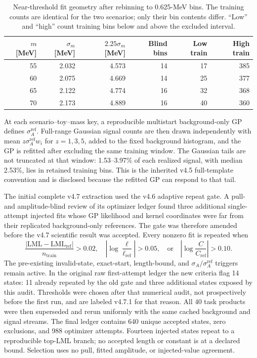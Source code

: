 \begin{table}[htbp]
\centering
\caption{Near-threshold fit geometry after rebinning to 0.625-MeV bins.  The
training counts are identical for the two scenarios; only their bin contents
differ.  ``Low'' and ``high'' count training bins below and above the excluded
interval.}
\label{tab:v4p7-training-geometry}
\small
\begin{tabular}{rrrrrr}
\toprule
$m$ [MeV] & $\sigma_m$ [MeV] & $2.25\sigma_m$ [MeV] & Blind bins & Low train & High train \\
\midrule
55 & 2.032 & 4.573 & 14 & 17 & 385 \\
60 & 2.075 & 4.669 & 14 & 25 & 377 \\
65 & 2.122 & 4.774 & 16 & 32 & 368 \\
70 & 2.173 & 4.889 & 16 & 40 & 360 \\
\bottomrule
\end{tabular}
\end{table}

At each scenario--toy--mass key, a reproducible multistart background-only GP
defines $\sigma_A^{\mathrm{ref}}$.  Full-range Gaussian signal counts are then
drawn independently with mean
$z\sigma_A^{\mathrm{ref}}w_i$ for $z=1,3,5$, added to the fixed background
histogram, and the GP is refitted after excluding the same training window.
The Gaussian tails are not truncated at that window: 1.53--3.97\% of each
realized signal, with median 2.53\%, lies in retained training bins.  This is
the inherited v4.5 full-template convention and is disclosed because the
refitted GP can respond to that tail.

The initial complete v4.7 extraction used the v4.6 adaptive repeat gate.  A
pull- and amplitude-blind review of its optimizer ledger found three
additional single-attempt injected fits whose GP likelihood and kernel
coordinates were far from their replicated background-only references.  The
gate was therefore amended before the v4.7 scientific result was accepted.
Every nonzero fit is repeated when
\begin{equation}
 \frac{|\mathrm{LML}-\mathrm{LML}_{\mathrm{ref}}|}{n_{\mathrm{train}}}>0.02,
 \quad
 \left|\log\frac{\ell}{\ell_{\mathrm{ref}}}\right|>0.05,
 \quad\text{or}\quad
 \left|\log\frac{C}{C_{\mathrm{ref}}}\right|>0.10 .
 \label{eq:v4p7-optimizer-repeat-amendment}
\end{equation}
The pre-existing invalid-state, exact-start, length-bound, and
$\sigma_A/\sigma_A^{\mathrm{ref}}$ triggers remain active.  In the original
raw first-attempt ledger the new criteria flag 14 states: 11 already repeated
by the old gate and three additional states exposed by this audit.  Thresholds
were chosen after that numerical audit, not prospectively before the first
run, and are labeled v4.7.1 for that reason.  All 40 task products were then
superseded and rerun uniformly with the same cached background and signal
streams.  The final ledger contains 640 unique accepted states, zero
exclusions, and 988 optimizer attempts.  Fourteen injected states repeat to a
reproducible top-LML branch; no accepted length or constant is at a declared
bound.  Selection uses no pull, fitted amplitude, or injected-value agreement.

